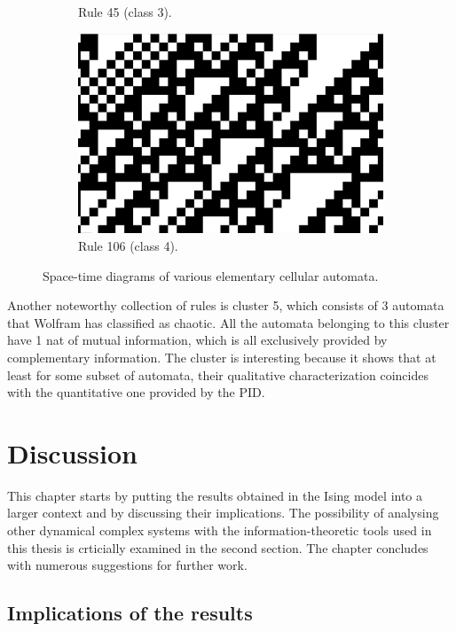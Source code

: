 \documentclass[12pt]{article}
\begin{document}
\begin{figure} [!h]
\begin{subfigure}{.5\textwidth}
  \caption{Rule 45 (class 3).}
  \label{fig:rule45-zoomed}
\end{subfigure}
\begin{subfigure}{.5\textwidth}
  \centering
  \includegraphics[width=.9\linewidth]{rule106-zoomed}
  \caption{Rule 106 (class 4).}
  \label{fig:rule106-zoomed}
\end{subfigure}
\caption{Space-time diagrams of various elementary cellular automata.}
\label{fig:eca-complex-rules-zoomed}
\end{figure}

Another noteworthy collection of rules is cluster 5, which consists  of 3 automata that Wolfram has classified as chaotic. All the automata belonging to this cluster have 1 nat of mutual information, which is all exclusively provided by complementary information. The cluster is interesting because it shows that at least for some subset of automata, their qualitative characterization coincides with the quantitative one provided by the PID. 

\newpage
\section{Discussion}

This chapter starts by putting the results obtained in the Ising model into a larger context and by discussing their implications.  The possibility of analysing other dynamical complex systems with the information-theoretic tools used in this thesis is crticially examined in the second section. The chapter concludes with numerous suggestions for further work. 

\subsection{Implications of the results}
\end{document}
